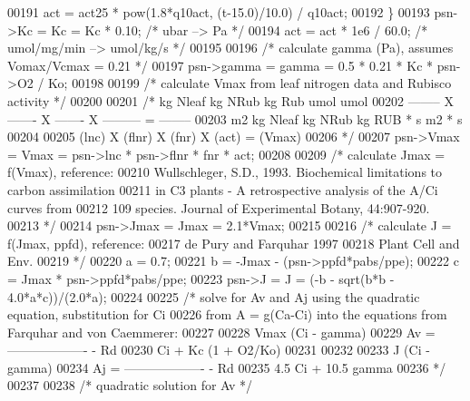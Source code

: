 \begin{DoxyCode}
{00191         act = act25 * pow(1.8*q10act, (t-15.0)/10.0) / q10act;
00192     \}
00193     psn->Kc = Kc = Kc * 0.10;   \textcolor{comment}{/* ubar --> Pa */}
00194     act = act * 1e6 / 60.0;     \textcolor{comment}{/* umol/mg/min --> umol/kg/s */}
00195     
00196     \textcolor{comment}{/* calculate gamma (Pa), assumes Vomax/Vcmax = 0.21 */}
00197     psn->gamma = gamma = 0.5 * 0.21 * Kc * psn->O2 / Ko;
00198      
00199     \textcolor{comment}{/* calculate Vmax from leaf nitrogen data and Rubisco activity */}
00200     
00201     \textcolor{comment}{/* kg Nleaf   kg NRub    kg Rub      umol            umol }
00202 \textcolor{comment}{       -------- X -------  X ------- X ---------   =   --------}
00203 \textcolor{comment}{          m2      kg Nleaf   kg NRub   kg RUB * s       m2 * s       }
00204 \textcolor{comment}{       }
00205 \textcolor{comment}{         (lnc)  X  (flnr)  X  (fnr)  X   (act)     =    (Vmax)}
00206 \textcolor{comment}{    */}
00207     psn->Vmax = Vmax = psn->lnc * psn->flnr * fnr * act;
00208     
00209     \textcolor{comment}{/* calculate Jmax = f(Vmax), reference:}
00210 \textcolor{comment}{    Wullschleger, S.D., 1993.  Biochemical limitations to carbon assimilation}
00211 \textcolor{comment}{        in C3 plants - A retrospective analysis of the A/Ci curves from}
00212 \textcolor{comment}{        109 species. Journal of Experimental Botany, 44:907-920.}
00213 \textcolor{comment}{    */}
00214     psn->Jmax = Jmax = 2.1*Vmax;
00215     
00216     \textcolor{comment}{/* calculate J = f(Jmax, ppfd), reference:}
00217 \textcolor{comment}{    de Pury and Farquhar 1997}
00218 \textcolor{comment}{    Plant Cell and Env.}
00219 \textcolor{comment}{    */}
00220     a = 0.7;
00221     b = -Jmax - (psn->ppfd*pabs/ppe);
00222     c = Jmax * psn->ppfd*pabs/ppe;
00223     psn->J = J = (-b - sqrt(b*b - 4.0*a*c))/(2.0*a);
00224     
00225     \textcolor{comment}{/* solve for Av and Aj using the quadratic equation, substitution for Ci}
00226 \textcolor{comment}{    from A = g(Ca-Ci) into the equations from Farquhar and von Caemmerer:}
00227 \textcolor{comment}{         }
00228 \textcolor{comment}{           Vmax (Ci - gamma)}
00229 \textcolor{comment}{    Av =  -------------------   -   Rd}
00230 \textcolor{comment}{          Ci + Kc (1 + O2/Ko)}
00231 \textcolor{comment}{    }
00232 \textcolor{comment}{    }
00233 \textcolor{comment}{             J (Ci - gamma)}
00234 \textcolor{comment}{    Aj  =  -------------------  -   Rd}
00235 \textcolor{comment}{           4.5 Ci + 10.5 gamma  }
00236 \textcolor{comment}{    */}
00237 
00238     \textcolor{comment}{/* quadratic solution for Av */}    
}
\end{DoxyCode}
